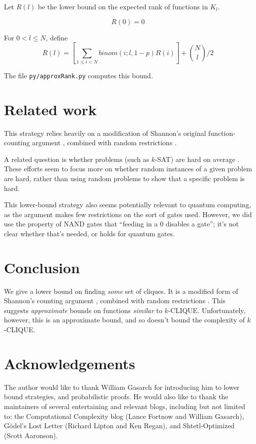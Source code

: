 \documentclass[12pt]{article}
\theoremstyle{definition}
\begin{document}
Let $R(l)$ be the lower bound on the expected rank of functions in $K_l$.

\[
R(0) = 0
\]

For $0 < l \le N$, define
\[
	R(l) = [ \sum_{1\le i < N} binom(i; l, 1-p) R(i) ] + {N \choose l}/2
\]

The file {\tt py/approxRank.py} computes this bound.

\section{Related work}

This strategy relies heavily on a modification of Shannon's original
function-counting argument \cite{shannon_synthesis_1949},
combined with random restrictions
\cite{subbotovskaya1963comparison} \cite{hastad1987lower}.

A related question is whether problems
(such as $k$-SAT) are
hard on average \cite{bogdanov2006average}.
These efforts seem to focus more on whether
random
instances of a given problem are hard, rather
than using random problems to show that
a specific problem is hard.

This lower-bound strategy also seems potentially
relevant to quantum computing,
as the argument makes few restrictions on the sort of gates used.
However, we did use the property of NAND gates that ``feeding in
a 0 disables a gate''; it's not clear whether that's needed,
or holds for quantum gates.

\section{Conclusion}

We give a lower bound on finding {\em some} set of cliques.
It is a modified form of Shannon's counting argument
\cite{shannon_synthesis_1949}, combined with random restrictions
\cite{subbotovskaya1963comparison} \cite{hastad1987lower}.
This suggests {\em approximate} bounds on functions {\em similar} to $k$-CLIQUE.
Unfortunately, however, this is an approximate bound,
and so doesn't bound the complexity of $k$-CLIQUE.

\section{Acknowledgements}

The author would like to thank William Gasarch for introducing him
to lower bound strategies, and probabilistic proofs.
He would also like to thank the maintainers of
several entertaining and relevant blogs, including but
not limited to: the Computational Complexity blog
(Lance Fortnow and William Gasarch), 
G\"odel's Lost Letter (Richard Lipton and Ken Regan),
and Shtetl-Optimized (Scott Aaronson). 
\end{document}
